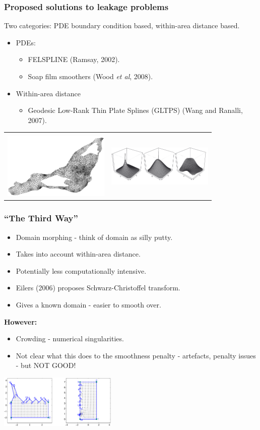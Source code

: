 \documentclass[ignorenonframetext]{beamer} %
\newcommand{\bc}{\begin{center}}
\newcommand{\ec}{\end{center}}
\newcommand{\bi}{\begin{itemize}}
\newcommand{\ei}{\end{itemize}}
\begin{document}
\begin{frame}
	\frametitle{Proposed solutions to leakage problems}
	Two categories: PDE boundary condition based, within-area distance based.
       \bi
         \item PDEs:
	  \bi
             \item FELSPLINE (Ramsay, 2002).
             \item Soap film smoothers (Wood \emph{et al}, 2008).
           \ei
           \item Within-area distance
           \bi
             \item Geodesic Low-Rank  Thin Plate Splines (GLTPS) (Wang and Ranalli, 2007).
           \ei
        \ei
        \bc\begin{tabular}{@{}cc}
          & \\
        \includegraphics[width=2in]{figs/ramsaytriangulation.png}&\includegraphics[width=2in]{figs/soapbases.png}\\
        \end{tabular}
        \ec
\end{frame}


\begin{frame}
	\frametitle{``The Third Way''}
      \bi
         \item Domain morphing - think of domain as silly putty.
         \item Takes into account within-area distance.
         \item Potentially less computationally intensive. 
         \item Eilers (2006) proposes Schwarz-Christoffel transform.
         \item Gives a known domain - easier to smooth over.
      \ei
      \bc
         \textbf{However:}
      \ec
      \bi
         \item Crowding - numerical singularities.
         \item Not clear what this does to the smoothness penalty - artefacts, penalty issues - but NOT GOOD!
      \ei
      \bc
         \includegraphics[height=1in]{figs/matlab-test-3}
      \ec
\end{frame}
\end{document}
